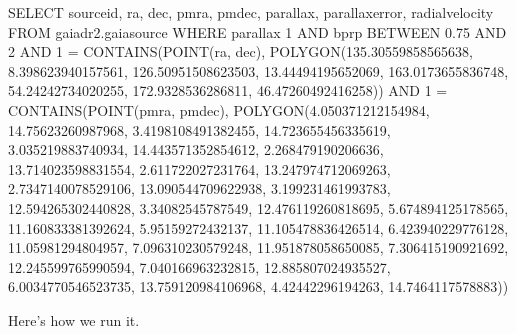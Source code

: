 \documentclass[letterpaper,10pt,english]{sphinxmanual}
\begin{document}
\begin{sphinxVerbatim}[commandchars=\\\{\}]
SELECT 
source\PYGZus{}id, ra, dec, pmra, pmdec, parallax, parallax\PYGZus{}error, radial\PYGZus{}velocity
FROM gaiadr2.gaia\PYGZus{}source
WHERE parallax \PYGZlt{} 1
  AND bp\PYGZus{}rp BETWEEN \PYGZhy{}0.75 AND 2 
  AND 1 = CONTAINS(POINT(ra, dec), 
                   POLYGON(135.30559858565638, 8.398623940157561, 126.50951508623503, 13.44494195652069, 163.0173655836748, 54.24242734020255, 172.9328536286811, 46.47260492416258))
  AND 1 = CONTAINS(POINT(pmra, pmdec),
                   POLYGON(\PYGZhy{}4.050371212154984, \PYGZhy{}14.75623260987968, \PYGZhy{}3.4198108491382455, \PYGZhy{}14.723655456335619, \PYGZhy{}3.035219883740934, \PYGZhy{}14.443571352854612, \PYGZhy{}2.268479190206636, \PYGZhy{}13.714023598831554, \PYGZhy{}2.611722027231764, \PYGZhy{}13.247974712069263, \PYGZhy{}2.7347140078529106, \PYGZhy{}13.090544709622938, \PYGZhy{}3.199231461993783, \PYGZhy{}12.594265302440828, \PYGZhy{}3.34082545787549, \PYGZhy{}12.476119260818695, \PYGZhy{}5.674894125178565, \PYGZhy{}11.160833381392624, \PYGZhy{}5.95159272432137, \PYGZhy{}11.105478836426514, \PYGZhy{}6.423940229776128, \PYGZhy{}11.05981294804957, \PYGZhy{}7.096310230579248, \PYGZhy{}11.951878058650085, \PYGZhy{}7.306415190921692, \PYGZhy{}12.245599765990594, \PYGZhy{}7.040166963232815, \PYGZhy{}12.885807024935527, \PYGZhy{}6.0034770546523735, \PYGZhy{}13.759120984106968, \PYGZhy{}4.42442296194263, \PYGZhy{}14.7464117578883))
\end{sphinxVerbatim}

Here’s how we run it.

\begin{sphinxVerbatim}[commandchars=\\\{\}]
   

  
\end{sphinxVerbatim}
\end{document}
